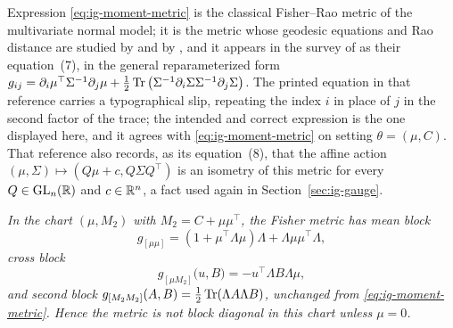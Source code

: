 \medskip
Expression \eqref{eq:ig-moment-metric} is the classical Fisher--Rao metric of the multivariate normal model; it is the metric whose geodesic equations and Rao distance are studied by \citet{Skovgaard1984} and by \citet{AtkinsonMitchell1981}, and it appears in the survey of \citet{PineleStrapassonCosta2020} as their equation~(7), in the general reparameterized form $g_{ij}=\partial_i\mu^\top\Sigma^{-1}\partial_j\mu+\tfrac12\operatorname{Tr}\left(\Sigma^{-1}\partial_i\Sigma \Sigma^{-1}\partial_j\Sigma\right)$. The printed equation in that reference carries a typographical slip, repeating the index $i$ in place of $j$ in the second factor of the trace; the intended and correct expression is the one displayed here, and it agrees with \eqref{eq:ig-moment-metric} on setting $\theta=(\mu,C)$. That reference also records, as its equation~(8), that the affine action $(\mu,\Sigma)\mapsto(Q\mu+c,Q\Sigma Q^\top)$ is an isometry of this metric for every $Q\in\mathrm{GL}_n(\mathbb R)$ and $c\in\mathbb R^{n}$, a fact used again in Section~\ref{sec:ig-gauge}.

\medskip
{}
\emph{In the chart $(\mu,M_2)$ with $M_2=C+\mu\mu^\top$, the Fisher metric has mean block}
\begin{equation}
g_{[\mu\mu]}=\left(1+\mu^\top\Lambda\mu\right)\Lambda+\Lambda\mu\mu^\top\Lambda ,
\label{eq:ig-meanblock}
\end{equation}
\emph{cross block}
\begin{equation}
g_{[\mu M_2]}\big(u,B\big)=-u^\top\Lambda B\Lambda\mu ,
\label{eq:ig-crossblock}
\end{equation}
\emph{and second block $g_{[M_2M_2]}(A,B)=\tfrac12\operatorname{Tr}(\Lambda A\Lambda B)$, unchanged from \eqref{eq:ig-moment-metric}. Hence the metric is not block diagonal in this chart unless $\mu=0$.}

